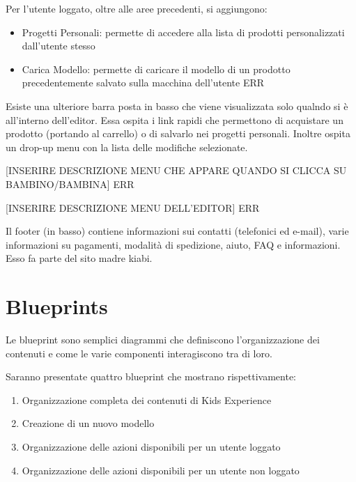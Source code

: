 \documentclass[12pt,italian,]{report}
\providecommand{\tightlist}{%
  \setlength{\itemsep}{0pt}\setlength{\parskip}{0pt}}
\begin{document}
Per l'utente loggato, oltre alle aree precedenti, si aggiungono:

\begin{itemize}
\tightlist
\item
  Progetti Personali: permette di accedere alla lista di prodotti
  personalizzati dall'utente stesso
\item
  Carica Modello: permette di caricare il modello di un prodotto
  precedentemente salvato sulla macchina dell'utente ERR
\end{itemize}

Esiste una ulteriore barra posta in basso che viene visualizzata solo
qualndo si è all'interno dell'editor. Essa ospita i link rapidi che
permettono di acquistare un prodotto (portando al carrello) o di
salvarlo nei progetti personali. Inoltre ospita un drop-up menu con la
lista delle modifiche selezionate.

{[}INSERIRE DESCRIZIONE MENU CHE APPARE QUANDO SI CLICCA SU
BAMBINO/BAMBINA{]} ERR

{[}INSERIRE DESCRIZIONE MENU DELL'EDITOR{]} ERR

Il footer (in basso) contiene informazioni sui contatti (telefonici ed
e-mail), varie informazioni su pagamenti, modalità di spedizione, aiuto,
FAQ e informazioni. Esso fa parte del sito madre kiabi.

\hypertarget{blueprints}{%
\section{Blueprints}\label{blueprints}}

Le blueprint sono semplici diagrammi che definiscono l'organizzazione
dei contenuti e come le varie componenti interagiscono tra di loro.

Saranno presentate quattro blueprint che mostrano rispettivamente:

\begin{enumerate}
\def\labelenumi{\arabic{enumi}.}
\tightlist
\item
  Organizzazione completa dei contenuti di Kids Experience
\item
  Creazione di un nuovo modello
\item
  Organizzazione delle azioni disponibili per un utente loggato
\item
  Organizzazione delle azioni disponibili per un utente non loggato
\end{enumerate}
\end{document}
